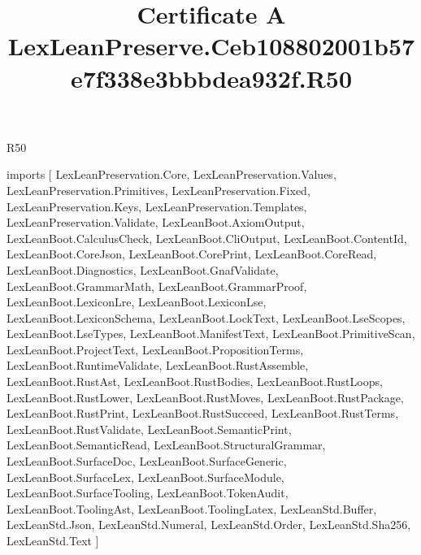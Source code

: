\begin{lexlean}{R50}
\title{Certificate A LexLeanPreserve.Ceb108802001b57e7f338e3bbbdea932f.R50}
\begin{coremodule}
imports [
  LexLeanPreservation.Core,
  LexLeanPreservation.Values,
  LexLeanPreservation.Primitives,
  LexLeanPreservation.Fixed,
  LexLeanPreservation.Keys,
  LexLeanPreservation.Templates,
  LexLeanPreservation.Validate,
  LexLeanBoot.AxiomOutput,
  LexLeanBoot.CalculusCheck,
  LexLeanBoot.CliOutput,
  LexLeanBoot.ContentId,
  LexLeanBoot.CoreJson,
  LexLeanBoot.CorePrint,
  LexLeanBoot.CoreRead,
  LexLeanBoot.Diagnostics,
  LexLeanBoot.GnafValidate,
  LexLeanBoot.GrammarMath,
  LexLeanBoot.GrammarProof,
  LexLeanBoot.LexiconLre,
  LexLeanBoot.LexiconLse,
  LexLeanBoot.LexiconSchema,
  LexLeanBoot.LockText,
  LexLeanBoot.LseScopes,
  LexLeanBoot.LseTypes,
  LexLeanBoot.ManifestText,
  LexLeanBoot.PrimitiveScan,
  LexLeanBoot.ProjectText,
  LexLeanBoot.PropositionTerms,
  LexLeanBoot.RuntimeValidate,
  LexLeanBoot.RustAssemble,
  LexLeanBoot.RustAst,
  LexLeanBoot.RustBodies,
  LexLeanBoot.RustLoops,
  LexLeanBoot.RustLower,
  LexLeanBoot.RustMoves,
  LexLeanBoot.RustPackage,
  LexLeanBoot.RustPrint,
  LexLeanBoot.RustSucceed,
  LexLeanBoot.RustTerms,
  LexLeanBoot.RustValidate,
  LexLeanBoot.SemanticPrint,
  LexLeanBoot.SemanticRead,
  LexLeanBoot.StructuralGrammar,
  LexLeanBoot.SurfaceDoc,
  LexLeanBoot.SurfaceGeneric,
  LexLeanBoot.SurfaceLex,
  LexLeanBoot.SurfaceModule,
  LexLeanBoot.SurfaceTooling,
  LexLeanBoot.TokenAudit,
  LexLeanBoot.ToolingAst,
  LexLeanBoot.ToolingLatex,
  LexLeanStd.Buffer,
  LexLeanStd.Json,
  LexLeanStd.Numeral,
  LexLeanStd.Order,
  LexLeanStd.Sha256,
  LexLeanStd.Text
]


\end{coremodule}
\end{lexlean}
